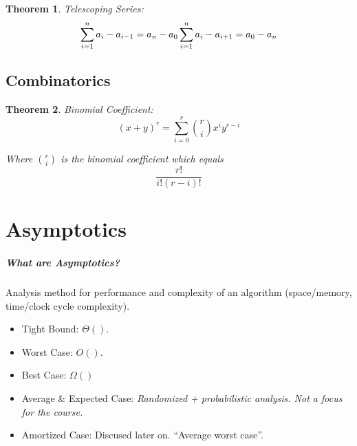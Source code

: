 \documentclass[a4paper,12pt]{report}
\newtheorem{theorem}{Theorem}
\begin{document}
\begin{theorem}{Telescoping Series:}
\begin{equation}
\sum_{i=1}^{n} a_i - a_{i-1} = a_n - a_0 \\
\sum_{i = 1}^{n} a_i - a_{i+1} = a_0 - a_n
\end{equation}
\end{theorem}


\section{Combinatorics}

\begin{theorem}{Binomial Coefficient:}
\begin{equation}
(x+y)^r = \sum_{i = 0}^{r} {r\choose i} x^i y^{r-i}
\end{equation}

Where $r\choose i$ is the binomial coefficient which equals $$\frac{r!}{i!(r-i)!}$$

\end{theorem}




\chapter{Asymptotics}

\paragraph{What are Asymptotics? } Analysis method for performance and complexity of an algorithm (space/memory, time/clock cycle complexity).

\begin{itemize}
\item Tight Bound: $\Theta()$.
\item Worst Case: $O()$.
\item Best Case: $\Omega()$
\item Average \& Expected Case: \textit{Randomized + probabilistic analysis. Not a focus for the course.} 
\item Amortized Case: Discused later on. ``Average worst case''.
\end{itemize}
\end{document}
